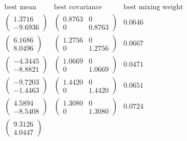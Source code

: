 \documentclass{article}
\begin{document}
\begin{math}
\begin{aligned}
\mbox{best mean} & \mbox{best covariance} & \mbox{best mixing weight} \\
\left( \begin{array}{c}  1.3716  \\   -9.6936
\end{array} \right) 
& \left( \begin{array}{cc}   0.8763 & 0 \\   0 & 0.8763
\end{array} \right) 
&   0.0646  \\ %
\left( \begin{array}{c}  6.1686 \\  8.0496    
\end{array} \right)
& \left( \begin{array}{cc}   1.2756 & 0 \\   0 & 1.2756 
\end{array} \right) 
&   0.0667\\ %
\left( \begin{array}{c}   -4.3445 \\  -8.8821 
\end{array} \right) 
& \left( \begin{array}{cc}   1.0669  & 0 \\   0 & 1.0669 
\end{array} \right) 
&   0.0471 \\ %
\left( \begin{array}{c}  -9.7203 \\  -1.4463
\end{array} \right) 
& \left( \begin{array}{cc}   1.4420 & 0 \\   0 & 1.4420
\end{array} \right) 
&   0.0651\\ %
\left( \begin{array}{c}  4.5894 \\  -8.5408
\end{array} \right) 
& \left( \begin{array}{cc}    1.3080 &  0 \\   0 &   1.3080
\end{array} \right) 
&   0.0724\\ %
\left( \begin{array}{c}   9.3126 \\  4.0447 
\end{array} \right) 

\end{aligned}
\end{math}
\end{document}
